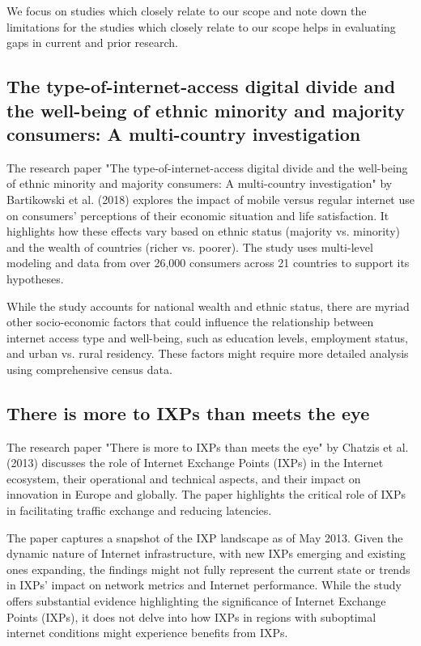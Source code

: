 \documentclass[conference]{IEEEtran}
\begin{document}
We focus on studies which closely relate to our scope and note down the limitations for the studies which closely relate to our scope helps in evaluating gaps in current and prior research.

\subsection{\textbf{The type-of-internet-access digital divide and the well-being of ethnic minority and majority consumers: A multi-country investigation \cite{2}}}
The research paper "The type-of-internet-access digital divide and the well-being of ethnic minority and majority consumers: A multi-country investigation" by Bartikowski et al. (2018) explores the impact of mobile versus regular internet use on consumers' perceptions of their economic situation and life satisfaction. It highlights how these effects vary based on ethnic status (majority vs. minority) and the wealth of countries (richer vs. poorer). The study uses multi-level modeling and data from over 26,000 consumers across 21 countries to support its hypotheses.

While the study accounts for national wealth and ethnic status, there are myriad other socio-economic factors that could influence the relationship between internet access type and well-being, such as education levels, employment status, and urban vs. rural residency. These factors might require more detailed analysis using comprehensive census data.

\subsection{\textbf{There is more to IXPs than meets the eye \cite{3}}}
The research paper "There is more to IXPs than meets the eye" by Chatzis et al. (2013) discusses the role of Internet Exchange Points (IXPs) in the Internet ecosystem, their operational and technical aspects, and their impact on innovation in Europe and globally. The paper highlights the critical role of IXPs in facilitating traffic exchange and reducing latencies.

The paper captures a snapshot of the IXP landscape as of May 2013. Given the dynamic nature of Internet infrastructure, with new IXPs emerging and existing ones expanding, the findings might not fully represent the current state or trends in IXPs' impact on network metrics and Internet performance. While the study offers substantial evidence highlighting the significance of Internet Exchange Points (IXPs), it does not delve into how IXPs in regions with suboptimal internet conditions might experience benefits from IXPs.
\end{document}
